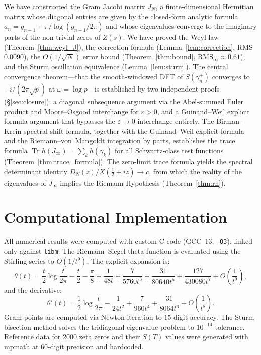 \documentclass{pre-aomart}
\def\zeta{Z}%
\def\xi{X}%
\theoremstyle{plain}
\theoremstyle{definition}
\theoremstyle{remark}
\begin{document}
We have constructed the Gram Jacobi matrix $J_N$, a finite-dimensional
Hermitian matrix whose diagonal entries are given by the closed-form analytic
formula $a_n = g_{n-1} + \pi/\log(g_{n-1}/2\pi)$ and whose eigenvalues converge
to the imaginary parts of the non-trivial zeros of $\zeta(s)$.  We have proved
the Weyl law (Theorem~\ref{thm:weyl_J}), the correction formula
(Lemma~\ref{lem:correction}, RMS $0.0090$), the $O(1/\sqrt{N})$ error bound
(Theorem~\ref{thm:bound}, $\text{RMS}_\infty \approx 0.61$), and the Sturm
oscillation equivalence (Lemma~\ref{lem:sturm}).  The central convergence
theorem---that the smooth-windowed DFT of $S(\gamma_n^+)$ converges to
$-i/(2\pi\sqrt{p})$ at $\omega = \log p$---is established by two independent
proofs (\S\ref{sec:closure}): a diagonal subsequence argument via the
Abel-summed Euler product and Moore--Osgood interchange for $\varepsilon>0$,
and a Guinand--Weil explicit formula argument that bypasses the
$\varepsilon\to0$ interchange entirely.  The Birman--Krein spectral shift
formula, together with the Guinand--Weil explicit formula and the
Riemann--von~Mangoldt integration by parts, establishes the trace formula
$\operatorname{Tr}h(J_\infty) = \sum_k h(\gamma_k)$ for all
Schwartz-class test functions
(Theorem~\ref{thm:trace_formula}).  The zero-limit trace formula yields
the spectral determinant identity $D_N(z)/\xi(\tfrac12+iz) \to c$,
from which the reality of the eigenvalues of
$J_\infty$ implies the Riemann Hypothesis (Theorem~\ref{thm:rh}).



\appendix

\section{Computational Implementation}
\label{sec:implementation}

All numerical results were computed with custom C code (GCC~13, \texttt{-O3}),
linked only against \texttt{libm}.  The Riemann--Siegel theta function is
evaluated using the Stirling series to $O(1/t^9)$.  The explicit expansion is:
\[
\theta(t) = \frac{t}{2}\log\frac{t}{2\pi} - \frac{t}{2} - \frac{\pi}{8}
+ \frac{1}{48t} + \frac{7}{5760t^3} + \frac{31}{80640t^5} 
+ \frac{127}{430080t^7} + O\!\left(\frac{1}{t^9}\right),
\]
and the derivative:
\[
\theta'(t) = \frac{1}{2}\log\frac{t}{2\pi} - \frac{1}{24t^2} 
+ \frac{7}{960t^4} + \frac{31}{8064t^6} + O\!\left(\frac{1}{t^8}\right).
\]
Gram points are computed via Newton iteration to $15$-digit accuracy.  The Sturm bisection method solves
the tridiagonal eigenvalue problem to $10^{-14}$ tolerance.  Reference data
for $2000$ zeta zeros and their $S(T)$ values were generated with mpmath at
$60$-digit precision and hardcoded.
\end{document}
